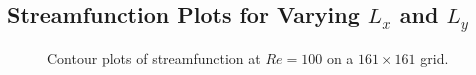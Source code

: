 \documentclass[11pt]{article}
\begin{document}
	
	\subsection{Streamfunction Plots for Varying $L_x$ and $L_y$}
	\begin{figure}[htp]
            \centering
            \hfill
            \caption{Contour plots of  streamfunction at $Re=100$ on a $161 \times 161$ grid.}
            \label{fig:contours}
        \end{figure}	
	
	
%	
		
\end{document}
